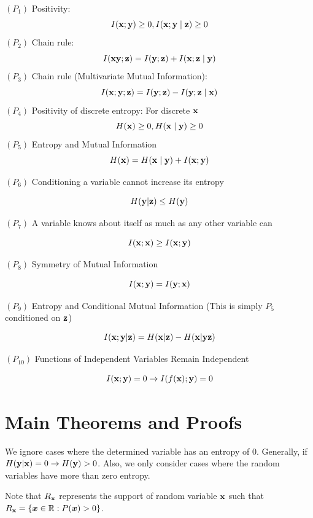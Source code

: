 \documentclass[letterpaper]{article} %
\theoremstyle{plain}
\theoremstyle{definition}
\theoremstyle{remark}
\begin{document}
$\left(P_1\right)$ Positivity:
$$
I({\mathbf{x}} ; {\mathbf{y}}) \geq 0, I({\mathbf{x}} ; {\mathbf{y}} \mid {\mathbf{z}}) \geq 0
$$
$\left(P_2\right)$ Chain rule:
$$
I({\mathbf{x}} {\mathbf{y}} ; {\mathbf{z}})=I({\mathbf{y}} ; {\mathbf{z}})+I({\mathbf{x}} ; {\mathbf{z}} \mid {\mathbf{y}})
$$
$\left(P_3\right)$ Chain rule (Multivariate Mutual Information):
$$
I({\mathbf{x}} ; {\mathbf{y}} ; {\mathbf{z}})=I({\mathbf{y}} ; {\mathbf{z}})-I({\mathbf{y}} ; {\mathbf{z}} \mid {\mathbf{x}})
$$
$\left(P_4\right)$ Positivity of discrete entropy:
For discrete ${\mathbf{x}}$
$$
H({\mathbf{x}}) \geq 0, H({\mathbf{x}} \mid {\mathbf{y}}) \geq 0
$$
$\left(P_5\right)$ Entropy and Mutual Information
$$
H({\mathbf{x}})=H({\mathbf{x}} \mid {\mathbf{y}})+I({\mathbf{x}} ; {\mathbf{y}})
$$

$(P_6)$ Conditioning a variable cannot increase its entropy

$$
H({\mathbf{y}}|{\mathbf{z}}) \leq H({\mathbf{y}})
$$

$(P_7)$ A variable knows about itself as much as any other variable can 

$$
I({\mathbf{x}};{\mathbf{x}}) \geq I({\mathbf{x}};{\mathbf{y}}) 
$$

$(P_8)$ Symmetry of Mutual Information

$$
I({\mathbf{x}};{\mathbf{y}}) = I({\mathbf{y}};{\mathbf{x}}) 
$$

$(P_9)$ Entropy and Conditional Mutual Information (This is simply $P_5$ conditioned on ${\mathbf{z}}$)

$$
I({\mathbf{x}};{\mathbf{y}}|{\mathbf{z}})  = H({\mathbf{x}}|{\mathbf{z}}) - H({\mathbf{x}}|{\mathbf{y}}{\mathbf{z}})
$$

$(P_{10})$ Functions of Independent Variables Remain Independent

$$
I({\mathbf{x}}; {\mathbf{y}}) = 0 \rightarrow I(f({\mathbf{x}});{\mathbf{y}}) = 0
$$


\section{Main Theorems and Proofs}


\label{mainproofs}

We ignore cases where the determined variable has an entropy of 0. Generally, if $H({\mathbf{y}}| {\mathbf{x}}) = 0 \rightarrow H({\mathbf{y}}) > 0$. Also, we only consider cases where the random variables have more than zero entropy.

Note that $R_{{\mathbf{x}}}$ represents the support of random variable ${\mathbf{x}}$ such that $R_{{\mathbf{x}}} = \{{\bm{x}} \in \mathbb{R} : P({\bm{x}}) > 0\}$.
\end{document}

